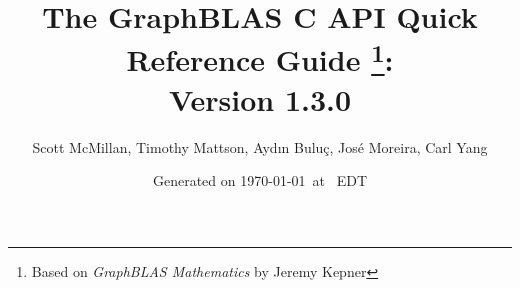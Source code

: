 \documentclass[11pt]{article}
\begin{document}
\linenumbers

\title{
The GraphBLAS C API Quick Reference Guide
\footnote{Based on \emph{GraphBLAS Mathematics} by Jeremy Kepner}: \\ 
{\large Version 1.3.0}
}

\author{Scott McMillan, Timothy Mattson, Ayd\i n Bulu\c{c}, Jos\'e Moreira, Carl Yang}

\date{Generated on \today\ at \currenttime\ EDT}

\newcommand{\kron}{\mathbin{\text{\footnotesize \textcircled{\raisebox{-0.3pt}{\footnotesize $\otimes$}}}}}
\newcommand{\grbarray}[1]{\bm{#1}}
\renewcommand{\vector}[1]{{\bf #1}}
\renewcommand{\matrix}[1]{{\bf #1}}
\renewcommand{\arg}[1]{{\sf #1}}
\newcommand{\zip}{{\mbox{zip}}}
\newcommand{\zap}{{\mbox{zap}}}
\newcommand{\ewiseadd}{{\mbox{\bf ewiseadd}}}
\newcommand{\ewisemult}{{\mbox{\bf ewisemult}}}
\newcommand{\mxm}{{\mbox{\bf mxm}}}
\newcommand{\vxm}{{\mbox{\bf vxm}}}
\newcommand{\mxv}{{\mbox{\bf mxv}}}
\newcommand{\gpit}[1]{{\sf #1}}
\newcommand{\ie}{{i.e.}}
\newcommand{\eg}{{e.g.}}
\newcommand{\nan}{{\sf NaN}}
\newcommand{\nil}{{\bf nil}}
\newcommand{\ifif}{{\bf if}}
\newcommand{\ifthen}{{\bf then}}
\newcommand{\ifelse}{{\bf else}}
\newcommand{\ifendif}{{\bf endif}}
\newcommand{\zero}{{\bf 0}}
\newcommand{\one}{{\bf 1}}
\newcommand{\true}{{\sf true}}
\newcommand{\false}{{\sf false}}
\newcommand{\syntax}{{C Syntax}}

\newcommand{\Dinn}{\mbox{$D_{in}$}}
\newcommand{\Din}[1]{\mbox{$D_{in_{#1}}$}}
\newcommand{\Dout}{\mbox{$D_{out}$}}

\newcommand{\bDinn}{\mbox{$\mathbf{D}_{in}$}}
\newcommand{\bDin}[1]{\mbox{$\mathbf{D}_{in_{#1}}$}}
\newcommand{\bDout}{\mbox{$\mathbf{D}_{out}$}}

\newcommand{\aydin}[1]{{{\color{orange}[Aydin: #1]}}}
\newcommand{\scott}[1]{{{\color{violet}[Scott: #1]}}}
\newcommand{\tim}[1]{{{\color{teal}[Tim: #1]}}}
\newcommand{\jose}[1]{{{\color{red}[Jose: #1]}}}
\newcommand{\carl}[1]{{{\color{blue}[Carl: #1]}}}
\newcommand{\ajy}[1]{{{\color{brown}[Yzelman: #1]}}}



\renewcommand{\comment}[1]{{}}
\newcommand{\glossBegin}{\begin{itemize}}
\newcommand{\glossItem}[1]{\item \emph{#1}: }
\newcommand{\glossEnd}{\end{itemize}}
\end{document}

